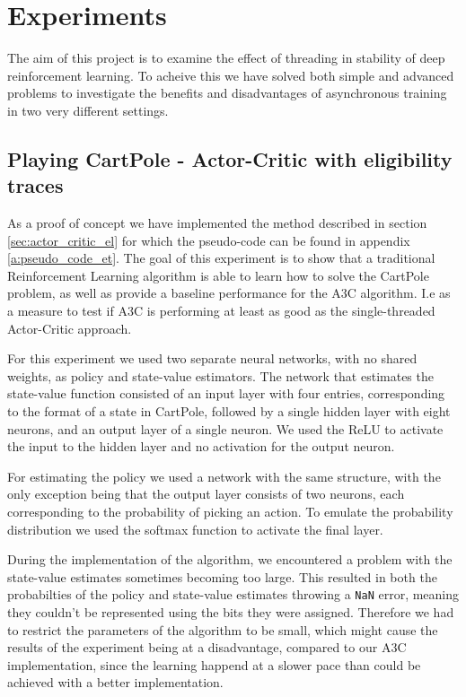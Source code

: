 \documentclass[11pt]{article}
\begin{document}

\section{Experiments}

The aim of this project is to examine the effect of threading
in stability of deep reinforcement learning.
To acheive this we have solved both simple and advanced problems to investigate
the benefits and disadvantages of asynchronous training in two very different
settings.

\subsection{Playing CartPole - Actor-Critic with eligibility traces}

As a proof of concept we have implemented the method described in section
\ref{sec:actor_critic_el} for which the pseudo-code
can be found in appendix \ref{a:pseudo_code_et}.
The goal of this experiment is to show that a 
traditional Reinforcement Learning algorithm
is able to learn how to solve the CartPole problem, as well as provide a
baseline performance for the A3C algorithm.
I.e as a measure to test if A3C is performing at least as good
as the single-threaded Actor-Critic approach.

For this experiment we used two separate neural networks, with no
shared weights, as policy and state-value estimators.
The network that estimates the state-value function consisted of an
input layer with four entries, corresponding to the format of a state in CartPole,
followed by a single hidden layer with eight neurons, and an output layer of a single
neuron.
We used the ReLU to activate the input to the
hidden layer and no activation for the output neuron.

For estimating the policy we used a network with the same structure,
with the only exception being that the output layer consists of two
neurons, each corresponding to the probability of picking an action.
To emulate the probability distribution we used the softmax function
to activate the final layer.

During the implementation of the algorithm, we encountered a problem with
the state-value estimates sometimes becoming too large.
This resulted in both the probabilties of the policy and state-value estimates throwing a \texttt{NaN} error,
meaning they couldn't be represented using the bits they were assigned.
Therefore we had to restrict the parameters of the algorithm to
be small, which might cause the results of the
experiment being at a disadvantage, compared to our A3C implementation, since the learning happend
at a slower pace than could be achieved with a better implementation.
\end{document}
